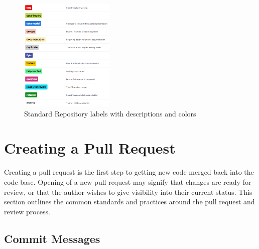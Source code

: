 \documentclass[a4paper,12pt,titlepage]{scrartcl}
\begin{document}
  	\begin{figure}[h]
  			\centering
    			\includegraphics[width=0.4\textwidth]{images/labels.png}
    			\caption{Standard Repository labels with descriptions and colors}
    			\label{fig:labels}
   	\end{figure}
   
	\section{Creating a Pull Request}\label{prprocess}
	
	Creating a pull request is the first step to getting new code merged back into the code base.
	Opening of a new pull request may signify that changes are ready for review, or that the author wishes to give visibility into their current status.
	This section outlines the common standards and practices around the pull request and review process.
	
	\subsection{Commit Messages}\label{commits}
	
\end{document}

